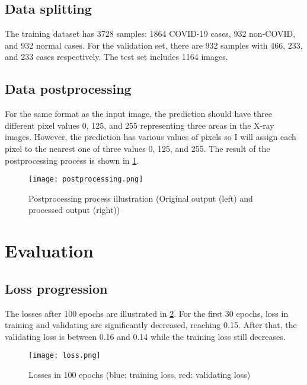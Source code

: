 \documentclass{article}
\begin{document}
\subsection{Data splitting}
The training dataset has 3728 samples: 1864 COVID-19 cases, 932 non-COVID, and 932 normal cases. For the validation set, there are 932 samples with 466, 233, and 233 cases respectively. The test set includes 1164 images.

\subsection{Data postprocessing}
For the same format as the input image, the prediction should have three different pixel values 0, 125, and 255 representing three areas in the X-ray images. However, the prediction has various values of pixels so I will assign each pixel to the nearest one of three values 0, 125, and 255. The result of the postprocessing process is shown in \ref{fig:post_processing}.
\begin{figure}[hbt!]
    \centering
    \texttt{[image: postprocessing.png]}
    \caption{Postprocessing process illustration (Original output (left) and processed output (right))}
    \label{fig:post_processing}
\end{figure}

\section{Evaluation}
\subsection{Loss progression}
The losses after 100 epochs are illustrated in \ref{fig:loss}. For the first 30 epochs, loss in training and validating are significantly decreased, reaching 0.15. After that, the validating loss is between 0.16 and 0.14 while the training loss still decreases.
\begin{figure}[hbt!]
    \centering
    \texttt{[image: loss.png]}
    \caption{Losses in 100 epochs (blue: training loss, red: validating loss)}
    \label{fig:loss}
\end{figure}
\end{document}
